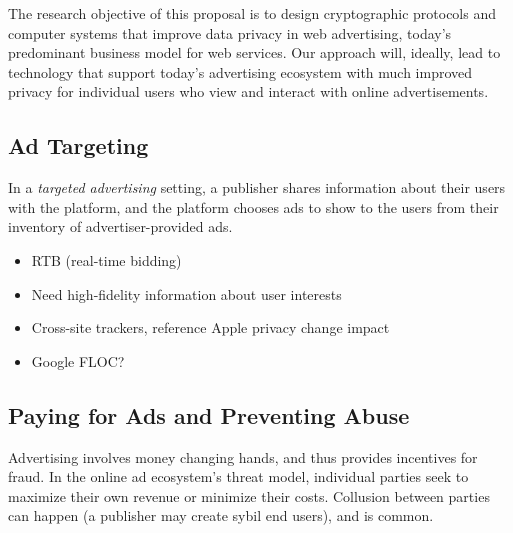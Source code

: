 The research objective of this proposal is to design cryptographic protocols and
computer systems that improve data privacy in web advertising, today's
predominant business model for web services.
%
Our approach will, ideally, lead to technology that support today's advertising
ecosystem with much improved privacy for individual users who view and
interact with online advertisements.
%




\subsection{Ad Targeting}

%
In a \emph{targeted advertising} setting, a publisher shares information about
their users with the platform, and the platform chooses ads to show to the
users from their inventory of advertiser-provided ads.
%

\begin{itemize}
  \item RTB (real-time bidding)
  \item Need high-fidelity information about user interests
  \item Cross-site trackers, reference Apple privacy change impact
  \item Google FLOC?
\end{itemize}

\subsection{Paying for Ads and Preventing Abuse}


%
Advertising involves money changing hands, and thus provides incentives for
fraud.
%
In the online ad ecosystem's threat model, individual parties seek to maximize
their own revenue or minimize their costs.
%
Collusion between parties can happen (\eg a publisher may create sybil end
users), and is common.
%

